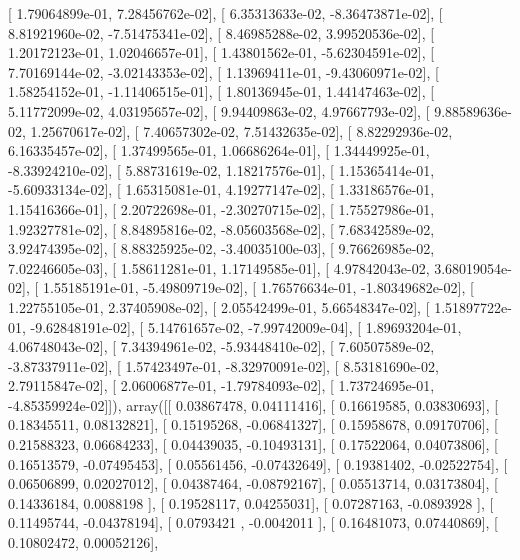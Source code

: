 \documentclass{article}
\begin{document}
       [  1.79064899e-01,   7.28456762e-02],
       [  6.35313633e-02,  -8.36473871e-02],
       [  8.81921960e-02,  -7.51475341e-02],
       [  8.46985288e-02,   3.99520536e-02],
       [  1.20172123e-01,   1.02046657e-01],
       [  1.43801562e-01,  -5.62304591e-02],
       [  7.70169144e-02,  -3.02143353e-02],
       [  1.13969411e-01,  -9.43060971e-02],
       [  1.58254152e-01,  -1.11406515e-01],
       [  1.80136945e-01,   1.44147463e-02],
       [  5.11772099e-02,   4.03195657e-02],
       [  9.94409863e-02,   4.97667793e-02],
       [  9.88589636e-02,   1.25670617e-02],
       [  7.40657302e-02,   7.51432635e-02],
       [  8.82292936e-02,   6.16335457e-02],
       [  1.37499565e-01,   1.06686264e-01],
       [  1.34449925e-01,  -8.33924210e-02],
       [  5.88731619e-02,   1.18217576e-01],
       [  1.15365414e-01,  -5.60933134e-02],
       [  1.65315081e-01,   4.19277147e-02],
       [  1.33186576e-01,   1.15416366e-01],
       [  2.20722698e-01,  -2.30270715e-02],
       [  1.75527986e-01,   1.92327781e-02],
       [  8.84895816e-02,  -8.05603568e-02],
       [  7.68342589e-02,   3.92474395e-02],
       [  8.88325925e-02,  -3.40035100e-03],
       [  9.76626985e-02,   7.02246605e-03],
       [  1.58611281e-01,   1.17149585e-01],
       [  4.97842043e-02,   3.68019054e-02],
       [  1.55185191e-01,  -5.49809719e-02],
       [  1.76576634e-01,  -1.80349682e-02],
       [  1.22755105e-01,   2.37405908e-02],
       [  2.05542499e-01,   5.66548347e-02],
       [  1.51897722e-01,  -9.62848191e-02],
       [  5.14761657e-02,  -7.99742009e-04],
       [  1.89693204e-01,   4.06748043e-02],
       [  7.34394961e-02,  -5.93448410e-02],
       [  7.60507589e-02,  -3.87337911e-02],
       [  1.57423497e-01,  -8.32970091e-02],
       [  8.53181690e-02,   2.79115847e-02],
       [  2.06006877e-01,  -1.79784093e-02],
       [  1.73724695e-01,  -4.85359924e-02]]), array([[ 0.03867478,  0.04111416],
       [ 0.16619585,  0.03830693],
       [ 0.18345511,  0.08132821],
       [ 0.15195268, -0.06841327],
       [ 0.15958678,  0.09170706],
       [ 0.21588323,  0.06684233],
       [ 0.04439035, -0.10493131],
       [ 0.17522064,  0.04073806],
       [ 0.16513579, -0.07495453],
       [ 0.05561456, -0.07432649],
       [ 0.19381402, -0.02522754],
       [ 0.06506899,  0.02027012],
       [ 0.04387464, -0.08792167],
       [ 0.05513714,  0.03173804],
       [ 0.14336184,  0.0088198 ],
       [ 0.19528117,  0.04255031],
       [ 0.07287163, -0.0893928 ],
       [ 0.11495744, -0.04378194],
       [ 0.0793421 , -0.0042011 ],
       [ 0.16481073,  0.07440869],
       [ 0.10802472,  0.00052126],
\end{document}
